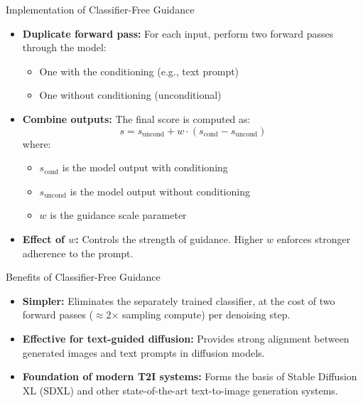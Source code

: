 \begin{frame}[fragile]{Implementation of Classifier-Free Guidance}
    \begin{itemize}
        \item \textbf{Duplicate forward pass:} For each input, perform two forward passes through the model:
        \begin{itemize}
            \item One with the conditioning (e.g., text prompt)
            \item One without conditioning (unconditional)
        \end{itemize}
        \item \textbf{Combine outputs:} The final score is computed as:
        \[
            s = s_{\text{uncond}} + w \cdot (s_{\text{cond}} - s_{\text{uncond}})
        \]
        where:
        \begin{itemize}
            \item $s_{\text{cond}}$ is the model output with conditioning
            \item $s_{\text{uncond}}$ is the model output without conditioning
            \item $w$ is the guidance scale parameter
        \end{itemize}
        \item \textbf{Effect of $w$:} Controls the strength of guidance. Higher $w$ enforces stronger adherence to the prompt.
    \end{itemize}
\end{frame}

\begin{frame}{Benefits of Classifier-Free Guidance}
    \begin{itemize}
        \item \textbf{Simpler:} Eliminates the separately trained classifier, at the cost of two forward passes ($\approx$2$\times$ sampling compute) per denoising step.
        \item \textbf{Effective for text-guided diffusion:} Provides strong alignment between generated images and text prompts in diffusion models.
        \item \textbf{Foundation of modern T2I systems:} Forms the basis of Stable Diffusion XL (SDXL) and other state-of-the-art text-to-image generation systems.
    \end{itemize}
\end{frame}